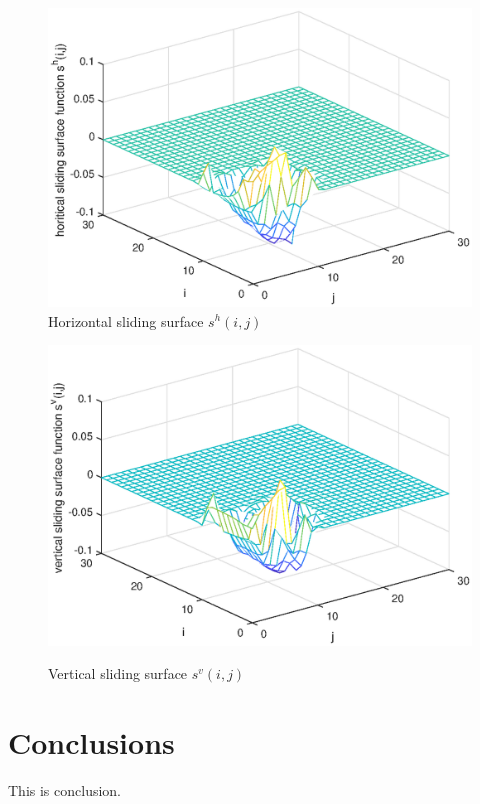\documentclass[conference]{IEEEtran}
\begin{document}
\begin{figure}[!htb]
	\centering\includegraphics[scale=0.6]{./simulations/hs_eps.eps}
	\caption{Horizontal  sliding surface $s^{h}(i,j)$}
	\label{fig9}
\end{figure}
\begin{figure}[!htb]
	\centering\includegraphics[scale=0.6]{./simulations/vs_eps.eps}\\ 
	\caption{Vertical sliding surface $s^{v}(i,j)$}
	\label{fig10}
\end{figure}


\section{Conclusions} \label{conclusion} 
This is conclusion.
\end{document}
